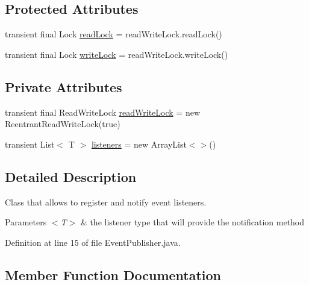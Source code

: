 \subsection*{Protected Attributes}
\begin{DoxyCompactItemize}
\item 
transient final Lock \mbox{\hyperlink{classcom_1_1fermod_1_1event_1_1EventPublisher_a9a0e9bb2169464a95ff912172496008d}{read\+Lock}} = read\+Write\+Lock.\+read\+Lock()
\item 
transient final Lock \mbox{\hyperlink{classcom_1_1fermod_1_1event_1_1EventPublisher_acde65c6b2ab5a8b71066b1fa20254cf7}{write\+Lock}} = read\+Write\+Lock.\+write\+Lock()
\end{DoxyCompactItemize}
\subsection*{Private Attributes}
\begin{DoxyCompactItemize}
\item 
transient final Read\+Write\+Lock \mbox{\hyperlink{classcom_1_1fermod_1_1event_1_1EventPublisher_a8acd43d374144fe2d44d67cd59e820fa}{read\+Write\+Lock}} = new Reentrant\+Read\+Write\+Lock(true)
\item 
transient List$<$ T $>$ \mbox{\hyperlink{classcom_1_1fermod_1_1event_1_1EventPublisher_a5f009aca2ca381c03151e765f5f8378e}{listeners}} = new Array\+List$<$$>$()
\end{DoxyCompactItemize}


\subsection{Detailed Description}
Class that allows to register and notify event listeners. 


\begin{DoxyParams}{Parameters}
{\em $<$\+T$>$} & the listener type that will provide the notification method \\
\hline
\end{DoxyParams}


Definition at line 15 of file Event\+Publisher.\+java.



\subsection{Member Function Documentation}
\mbox{\label{classcom_1_1fermod_1_1event_1_1EventPublisher_ad137b92c3d655d2e6cfd3349ffc41938}} 
